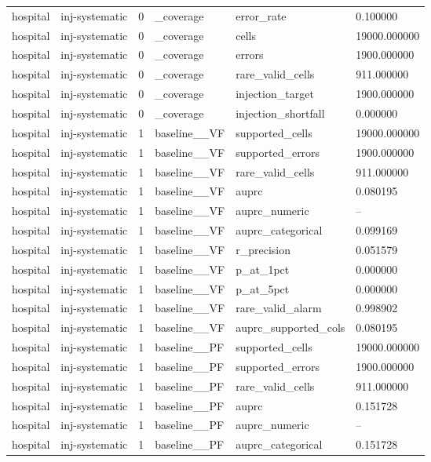 \begin{tabular}{llllll}
hospital & inj-systematic & 0 & \_coverage & error\_rate & 0.100000 \\
hospital & inj-systematic & 0 & \_coverage & cells & 19000.000000 \\
hospital & inj-systematic & 0 & \_coverage & errors & 1900.000000 \\
hospital & inj-systematic & 0 & \_coverage & rare\_valid\_cells & 911.000000 \\
hospital & inj-systematic & 0 & \_coverage & injection\_target & 1900.000000 \\
hospital & inj-systematic & 0 & \_coverage & injection\_shortfall & 0.000000 \\
hospital & inj-systematic & 1 & baseline\_\_VF & supported\_cells & 19000.000000 \\
hospital & inj-systematic & 1 & baseline\_\_VF & supported\_errors & 1900.000000 \\
hospital & inj-systematic & 1 & baseline\_\_VF & rare\_valid\_cells & 911.000000 \\
hospital & inj-systematic & 1 & baseline\_\_VF & auprc & 0.080195 \\
hospital & inj-systematic & 1 & baseline\_\_VF & auprc\_numeric & -- \\
hospital & inj-systematic & 1 & baseline\_\_VF & auprc\_categorical & 0.099169 \\
hospital & inj-systematic & 1 & baseline\_\_VF & r\_precision & 0.051579 \\
hospital & inj-systematic & 1 & baseline\_\_VF & p\_at\_1pct & 0.000000 \\
hospital & inj-systematic & 1 & baseline\_\_VF & p\_at\_5pct & 0.000000 \\
hospital & inj-systematic & 1 & baseline\_\_VF & rare\_valid\_alarm & 0.998902 \\
hospital & inj-systematic & 1 & baseline\_\_VF & auprc\_supported\_cols & 0.080195 \\
hospital & inj-systematic & 1 & baseline\_\_PF & supported\_cells & 19000.000000 \\
hospital & inj-systematic & 1 & baseline\_\_PF & supported\_errors & 1900.000000 \\
hospital & inj-systematic & 1 & baseline\_\_PF & rare\_valid\_cells & 911.000000 \\
hospital & inj-systematic & 1 & baseline\_\_PF & auprc & 0.151728 \\
hospital & inj-systematic & 1 & baseline\_\_PF & auprc\_numeric & -- \\
hospital & inj-systematic & 1 & baseline\_\_PF & auprc\_categorical & 0.151728 \\

\end{tabular}
